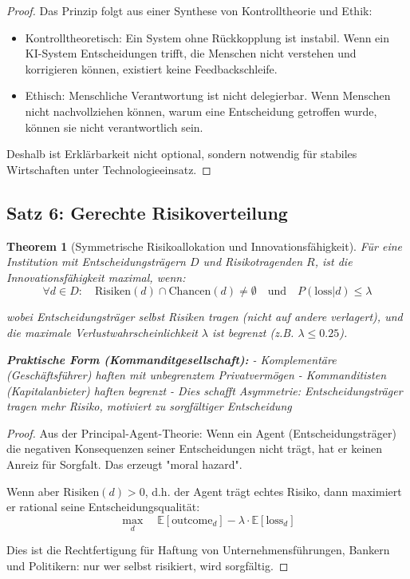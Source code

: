 \documentclass[a4paper, 12pt, twoside, openright]{report}
\newtheorem{theorem}{Theorem}[section]
\theoremstyle{definition}
\theoremstyle{definition}
\begin{document}
\begin{proof}
Das Prinzip folgt aus einer Synthese von Kontrolltheorie und Ethik:
\begin{itemize}
\item Kontrolltheoretisch: Ein System ohne Rückkopplung ist instabil. Wenn ein KI-System Entscheidungen trifft, die Menschen nicht verstehen und korrigieren können, existiert keine Feedbackschleife.
\item Ethisch: Menschliche Verantwortung ist nicht delegierbar. Wenn Menschen nicht nachvollziehen können, warum eine Entscheidung getroffen wurde, können sie nicht verantwortlich sein.
\end{itemize}

Deshalb ist Erklärbarkeit nicht optional, sondern notwendig für stabiles Wirtschaften unter Technologieeinsatz.
\end{proof}

\subsection{Satz 6: Gerechte Risikoverteilung}

\begin{theorem}[Symmetrische Risikoallokation und Innovationsfähigkeit]
\label{thm:risikoallokation}
Für eine Institution mit Entscheidungsträgern $D$ und Risikotragenden $R$, ist die Innovationsfähigkeit maximal, wenn:
\begin{equation}
\forall d \in D: \quad \text{Risiken}(d) \cap \text{Chancen}(d) \neq \emptyset \quad \text{und} \quad P(\text{loss}|d) \leq \lambda
\end{equation}

wobei Entscheidungsträger selbst Risiken tragen (nicht auf andere verlagert), und die maximale Verlustwahrscheinlichkeit $\lambda$ ist begrenzt (z.B. $\lambda \leq 0.25$).

\textbf{Praktische Form (Kommanditgesellschaft):} 
- Komplementäre (Geschäftsführer) haften mit unbegrenztem Privatvermögen
- Kommanditisten (Kapitalanbieter) haften begrenzt
- Dies schafft Asymmetrie: Entscheidungsträger tragen mehr Risiko, motiviert zu sorgfältiger Entscheidung
\end{theorem}

\begin{proof}
Aus der Principal-Agent-Theorie: Wenn ein Agent (Entscheidungsträger) die negativen Konsequenzen seiner Entscheidungen nicht trägt, hat er keinen Anreiz für Sorgfalt. Das erzeugt "moral hazard".

Wenn aber $\text{Risiken}(d) > 0$, d.h. der Agent trägt echtes Risiko, dann maximiert er rational seine Entscheidungsqualität:
\begin{equation}
\max_d \quad \mathbb{E}[\text{outcome}_d] - \lambda \cdot \mathbb{E}[\text{loss}_d]
\end{equation}

Dies ist die Rechtfertigung für Haftung von Unternehmensführungen, Bankern und Politikern: nur wer selbst risikiert, wird sorgfältig.
\end{proof}
\end{document}
